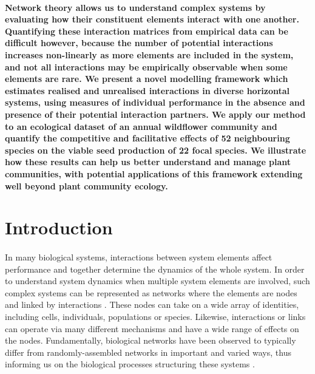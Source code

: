 \documentclass[a4,12pt]{article}
\begin{document}
    \paragraph{}
    \textbf{Network theory allows us to understand complex systems by evaluating how their constituent elements interact with one another. Quantifying these interaction matrices from empirical data can be difficult however, because the number of potential interactions increases non-linearly as more elements are included in the system, and not all interactions may be empirically observable when some elements are rare. We present a novel modelling framework which estimates realised and unrealised interactions in diverse horizontal systems, using measures of individual performance in the absence and presence of their potential interaction partners. We apply our method to an ecological dataset of an annual wildflower community and quantify the competitive and facilitative effects of 52 neighbouring species on the viable seed production of 22 focal species. We illustrate how these results can help us better understand and manage plant communities, with potential applications of this framework extending well beyond plant community ecology.}



\section{Introduction}


    
    \paragraph{}
    In many biological systems, interactions between system elements affect performance and together determine the dynamics of the whole system. In order to understand system dynamics when multiple system elements are involved, such complex systems can be represented as networks where the elements are nodes and linked by interactions \parencite{Pimm1978}. These nodes can take on a wide array of identities, including cells, individuals, populations or species. Likewise, interactions or links can operate via many different mechanisms and have a wide range of effects on the nodes. Fundamentally, biological networks have been observed to typically differ from randomly-assembled networks in important and varied ways, thus informing us on the biological processes structuring these systems \parencite{Dunne2002}.
\end{document}
